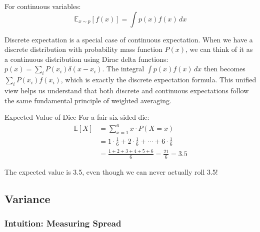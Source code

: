 For continuous variables:
\begin{equation}
\mathbb{E}_{x \sim p}[f(x)] = \int p(x) f(x) \, dx
\end{equation}

\begin{remark}
Discrete expectation is a special case of continuous expectation. When we have a discrete distribution with probability mass function $P(x)$, we can think of it as a continuous distribution using Dirac delta functions: $p(x) = \sum_i P(x_i) \delta(x - x_i)$. The integral $\int p(x) f(x) \, dx$ then becomes $\sum_i P(x_i) f(x_i)$, which is exactly the discrete expectation formula. This unified view helps us understand that both discrete and continuous expectations follow the same fundamental principle of weighted averaging.
\end{remark}

\begin{examplebox}{Expected Value of Dice}
For a fair six-sided die:
\begin{align}
\mathbb{E}[X] &= \sum_{x=1}^{6} x \cdot P(X=x) \\
&= 1 \cdot \frac{1}{6} + 2 \cdot \frac{1}{6} + \cdots + 6 \cdot \frac{1}{6} \\
&= \frac{1+2+3+4+5+6}{6} = \frac{21}{6} = 3.5
\end{align}

The expected value is 3.5, even though we can never actually roll 3.5!

\begin{center}
\end{center}
\end{examplebox}

\subsection{Variance}

\subsubsection{Intuition: Measuring Spread}

